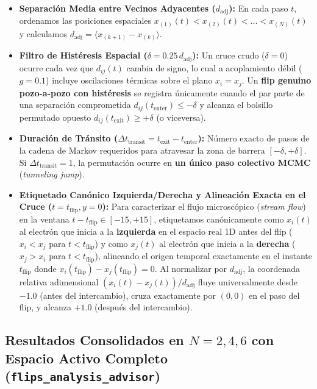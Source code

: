 \documentclass[10pt,a4paper]{article}
\begin{document}
\begin{itemize}
\item \textbf{Separación Media entre Vecinos Adyacentes ($d_{\mathrm{adj}}$):} En cada paso $t$, ordenamos las posiciones espaciales $x_{(1)}(t) < x_{(2)}(t) < \dots < x_{(N)}(t)$ y calculamos $d_{\mathrm{adj}} = \langle x_{(k+1)} - x_{(k)} \rangle$.
\item \textbf{Filtro de Histéresis Espacial ($\delta = 0.25\,d_{\mathrm{adj}}$):} Un cruce crudo ($\delta=0$) ocurre cada vez que $d_{ij}(t)$ cambia de signo, lo cual a acoplamiento débil ($g=0.1$) incluye oscilaciones térmicas sobre el plano $x_i = x_j$. Un \textbf{flip genuino pozo-a-pozo con histéresis} se registra únicamente cuando el par parte de una separación comprometida $d_{ij}(t_{\mathrm{enter}}) \le -\delta$ y alcanza el bolsillo permutado opuesto $d_{ij}(t_{\mathrm{exit}}) \ge +\delta$ (o viceversa).
\item \textbf{Duración de Tránsito ($\Delta t_{\mathrm{transit}} = t_{\mathrm{exit}} - t_{\mathrm{enter}}$):} Número exacto de pasos de la cadena de Markov requeridos para atravesar la zona de barrera $[-\delta, +\delta]$. Si $\Delta t_{\mathrm{transit}} = 1$, la permutación ocurre en \textbf{un único paso colectivo MCMC} (\textit{tunneling jump}).
\item \textbf{Etiquetado Canónico Izquierda/Derecha y Alineación Exacta en el Cruce ($t = t_{\mathrm{flip}}, y = 0$):} Para caracterizar el flujo microscópico (\textit{stream flow}) en la ventana $t - t_{\mathrm{flip}} \in [-15, +15]$, etiquetamos canónicamente como $x_i(t)$ al electrón que inicia a la \textbf{izquierda} en el espacio real 1D antes del flip ($x_i < x_j$ para $t < t_{\mathrm{flip}}$) y como $x_j(t)$ al electrón que inicia a la \textbf{derecha} ($x_j > x_i$ para $t < t_{\mathrm{flip}}$), alineando el origen temporal exactamente en el instante $t_{\mathrm{flip}}$ donde $x_i(t_{\mathrm{flip}}) - x_j(t_{\mathrm{flip}}) = 0$. Al normalizar por $d_{\mathrm{adj}}$, la coordenada relativa adimensional $(x_i(t) - x_j(t))/d_{\mathrm{adj}}$ fluye universalmente desde $-1.0$ (antes del intercambio), cruza exactamente por $(0, 0)$ en el paso del flip, y alcanza $+1.0$ (después del intercambio).
\end{itemize}




\subsection{Resultados Consolidados en $N=2, 4, 6$ con Espacio Activo Completo (\texttt{flips\_analysis\_advisor})}
\end{document}
